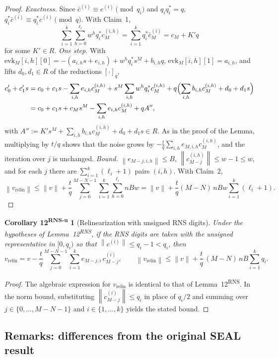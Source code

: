 \documentclass[11pt]{article}
\newcommand{\norm}[1]{\left\lVert #1\right\rVert}
\newcommand{\vrelin}{v_{\mathrm{relin}}}
\newcommand{\qstar}[1]{q^{*}_{#1}}
\theoremstyle{plain}
\newtheorem*{corollaryRNSu}{Corollary 12\textsuperscript{RNS-u}}
\theoremstyle{definition}
\theoremstyle{remark}
\begin{document}
\begin{proof}
\emph{Exactness.} Since $\bar c^{(i)}\equiv c^{(i)}\pmod{q_i}$ and $q_i\qstar{i}=q$,
$\qstar{i}\bar c^{(i)}\equiv\qstar{i}c^{(i)}\pmod q$. With Claim~1,
\[
 \sum_{i=1}^{k}\sum_{h=0}^{\ell_i}w^h\qstar{i}c_M^{(i,h)}=\sum_{i=1}^{k}\qstar{i}\bar c_M^{(i)}=c_M+K'q
\]
for some $K'\in R$. \emph{One step.} With $\mathrm{evk}_M[i,h][0]=-(a_{i,h}s+e_{i,h})+w^h\qstar{i}s^M+b_{i,h}q$,
$\mathrm{evk}_M[i,h][1]=a_{i,h}$, and lifts $d_0,d_1\in R$ of the reductions $[\cdot]_q$,
\begin{align*}
c'_0+c'_1s
&=c_0+c_1s-\sum_{i,h}e_{i,h}c_M^{(i,h)}+s^M\sum_{i,h}w^h\qstar{i}c_M^{(i,h)}
  +q\Bigl(\sum_{i,h}b_{i,h}c_M^{(i,h)}+d_0+d_1s\Bigr)\\
&=c_0+c_1s+c_Ms^M-\sum_{i,h}e_{i,h}c_M^{(i,h)}+qA'' ,
\end{align*}
with $A'':=K's^M+\sum_{i,h}b_{i,h}c_M^{(i,h)}+d_0+d_1s\in R$. As in the proof of the Lemma, multiplying by
$t/q$ shows that the noise grows by $-\frac tq\sum_{i,h}e_{M,i,h}c_M^{(i,h)}$, and the iteration over
$j$ is unchanged. \emph{Bound.} $\norm{e_{M-j,i,h}}\leq B$, $\norm{c_{M-j}^{(i,h)}}\leq w-1\leq w$,
and for each $j$ there are $\sum_{i=1}^{k}(\ell_i+1)$ pairs $(i,h)$. With Claim~2,
\[
 \norm{\vrelin}\leq\norm{v}+\frac{t}{q}\sum_{j=0}^{M-N-1}\sum_{i=1}^{k}\sum_{h=0}^{\ell_i}nBw
 =\norm{v}+\frac{t}{q}(M-N)\,nBw\sum_{i=1}^{k}(\ell_i+1).
\]
\end{proof}

\begin{corollaryRNSu}[Relinearization with unsigned RNS digits]
Under the hypotheses of Lemma~12\textsuperscript{RNS}, if the RNS digits are taken with the unsigned representative in $[0,q_i)$ so that $\norm{c^{(i)}}\leq q_i-1<q_i$, then
\[
 \vrelin=v-\frac{t}{q}\sum_{j=0}^{M-N-1}\sum_{i=1}^{k}e_{M-j,i}\,c_{M-j}^{(i)},
 \qquad
 \norm{\vrelin}\leq\norm{v}+\frac{t}{q}\,(M-N)\,nB\sum_{i=1}^{k}q_i .
\]
\end{corollaryRNSu}

\begin{proof}
The algebraic expression for $\vrelin$ is identical to that of Lemma~12\textsuperscript{RNS}. In the norm bound, substituting $\norm{c_{M-j}^{(i)}}\leq q_i$ in place of $q_i/2$ and summing over $j\in\{0,\dots,M-N-1\}$ and $i\in\{1,\dots,k\}$ yields the stated bound.
\end{proof}

\subsection{Remarks: differences from the original SEAL result}
\end{document}
